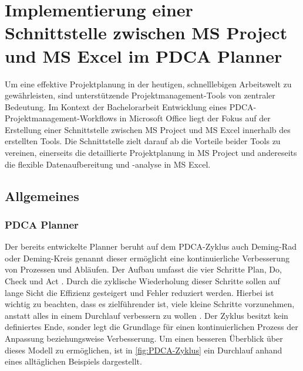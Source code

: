 \documentclass[11pt,a4paper]{report}
\begin{document}
\chapter{
Implementierung einer Schnittstelle zwischen MS Project und MS Excel im PDCA Planner
} \label{chap:sling}
Um eine effektive Projektplanung in der heutigen, schnelllebigen Arbeitswelt zu gewährleisten, sind unterstützende Projektmanagement-Tools von zentraler Bedeutung. Im Kontext der Bachelorarbeit  \glqq Entwicklung eines PDCA-Projektmanagement-Workflows in Microsoft Office \grqq{} liegt der Fokus auf der Erstellung einer Schnittstelle zwischen MS Project und MS Excel innerhalb des erstellten Tools. Die Schnittstelle zielt darauf ab die Vorteile beider Tools zu vereinen, einerseits die detaillierte Projektplanung in MS Project und andereseits die flexible Datenaufbereitung und -analyse in MS Excel.


\section{Allgemeines}


\subsection{PDCA Planner}

Der bereits entwickelte Planner beruht auf dem PDCA-Zyklus auch Deming-Rad oder Deming-Kreis genannt dieser ermöglicht eine kontinuierliche Verbesserung von Prozessen und Abläufen. Der Aufbau umfasst die vier Schritte Plan, Do, Check und Act \cite{Syska}. Durch die zyklische Wiederholung dieser Schritte sollen auf lange Sicht die Effizienz gesteigert und Fehler reduziert werden. Hierbei ist wichtig zu beachten, dass es zielführender ist, viele kleine Schritte vorzunehmen, anstatt alles in einem Durchlauf verbessern zu wollen \cite{Syska}. Der Zyklus besitzt kein definiertes Ende, sonder legt die Grundlage für einen kontinuierlichen Prozess der Anpassung beziehungsweise Verbesserung. Um einen besseren Überblick über dieses Modell zu ermöglichen, ist in \ref{fig:PDCA-Zyklus} ein Durchlauf anhand eines alltäglichen Beispiels dargestellt.\newpage
\end{document}
